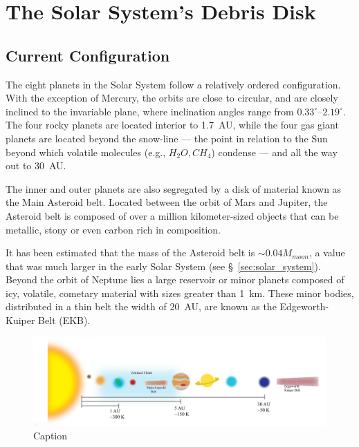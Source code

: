     
    
\section{The Solar System's Debris Disk}\label{sec:ch1_ssdisk}

     \subsection{Current Configuration}
    
    The eight planets in the Solar System follow a relatively ordered configuration. With the exception of Mercury, the orbits are close to circular, and are closely inclined to the invariable plane, where inclination angles range from $0.33^{\circ}$--$2.19^{\circ}$. The four rocky planets are located interior to 1.7~AU, while the four gas giant planets are located beyond the snow-line --- the point in relation to the Sun beyond which volatile molecules (e.g., $H_2O, CH_4$) condense --- and all the way out to 30~AU. 
    
    The inner and outer planets are also segregated by a disk of material known as the Main Asteroid belt. Located between the orbit of Mars and Jupiter, the Asteroid belt is composed of over a million kilometer-sized objects that can be metallic, stony or even carbon rich in composition.
    
    It has been estimated that the mass of the Asteroid belt is $\sim0.04 M_{moon}$, a value that was much larger in the early Solar System (see \S~\ref{sec:solar_system}). Beyond the orbit of Neptune lies a large reservoir or minor planets composed of icy, volatile, cometary material with sizes greater than 1~km. These minor bodies, distributed in a thin belt the width of 20~AU, are known as the Edgeworth-Kuiper Belt (EKB).
    
    \begin{figure}[!h]
    \centering
    \includegraphics[width=\textwidth]{Ch1/SolarSystem_RPatel} 
    \caption{Caption}
    \label{fig:solar_system}
    \end{figure}
    
